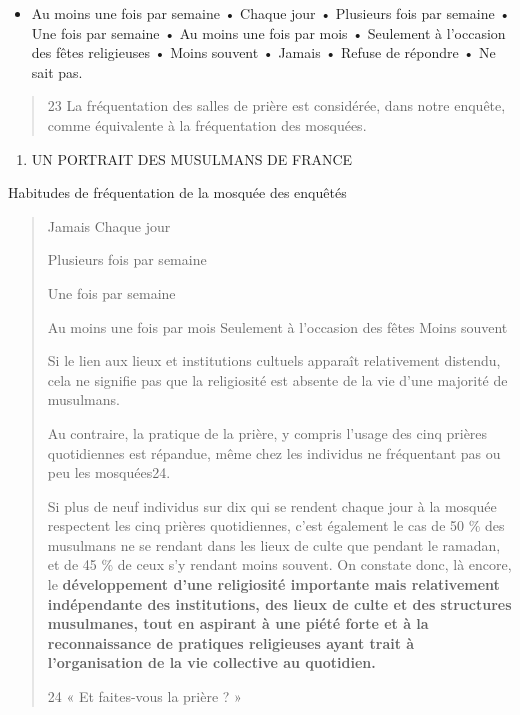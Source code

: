 \begin{itemize}
\item
  Au moins une fois par semaine • Chaque jour • Plusieurs fois par
  semaine • Une fois par semaine • Au moins une fois par mois •
  Seulement à l'occasion des fêtes religieuses • Moins souvent • Jamais
  • Refuse de répondre • Ne sait pas.
\end{itemize}

\begin{quote}
23 La fréquentation des salles de prière est considérée, dans notre
enquête, comme équivalente à la fréquentation des mosquées.
\end{quote}

\begin{enumerate}
\def\labelenumi{\Roman{enumi}.}
\item
  UN PORTRAIT DES MUSULMANS DE FRANCE
\end{enumerate}

Habitudes de fréquentation de la mosquée des enquêtés

\begin{quote}
Jamais Chaque jour

Plusieurs fois par semaine

Une fois par semaine

Au moins une fois par mois Seulement à l'occasion des fêtes Moins
souvent

Si le lien aux lieux et institutions cultuels apparaît relativement
distendu, cela ne signifie pas que la religiosité est absente de la vie
d'une majorité de musulmans.

Au contraire, la pratique de la prière, y compris l'usage des cinq
prières quotidiennes est répandue, même chez les individus ne
fréquentant pas ou peu les mosquées24.

Si plus de neuf individus sur dix qui se rendent chaque jour à la
mosquée respectent les cinq prières quotidiennes, c'est également le cas
de 50 \% des musulmans ne se rendant dans les lieux de culte que pendant
le ramadan, et de 45 \% de ceux s'y rendant moins souvent. On constate
donc, là encore, le \textbf{développement d'une religiosité importante
mais relativement indépendante des institutions, des lieux de culte et
des structures musulmanes, tout en aspirant à une piété forte et à la
reconnaissance de pratiques religieuses ayant trait à l'organisation de
la vie collective au quotidien.}

24 « Et faites-vous la prière ? »
\end{quote}

